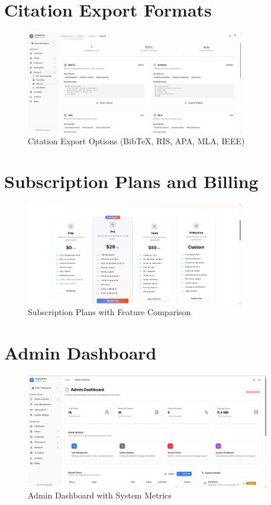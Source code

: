 \section{Citation Export Formats}

\begin{figure}[H]
\centering
\includegraphics[width=0.85\textwidth]{images/screenshots/citations_formats.png}
\caption{Citation Export Options (BibTeX, RIS, APA, MLA, IEEE)}
\label{fig:ss-citations}
\end{figure}

\section{Subscription Plans and Billing}

\begin{figure}[H]
\centering
\includegraphics[width=0.85\textwidth]{images/screenshots/billing_plan.png}
\caption{Subscription Plans with Feature Comparison}
\label{fig:ss-billing}
\end{figure}

\section{Admin Dashboard}

\begin{figure}[H]
\centering
\includegraphics[width=0.95\textwidth]{images/screenshots/admin_overview.png}
\caption{Admin Dashboard with System Metrics}
\label{fig:ss-admin}
\end{figure}
